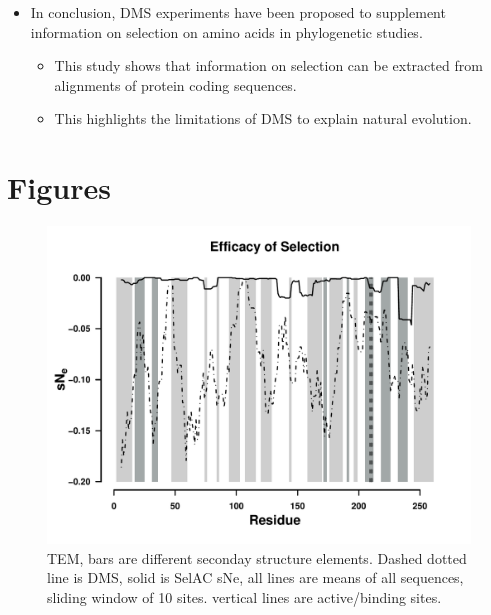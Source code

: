 \documentclass[12pt]{article}
\begin{document}
\begin{itemize}
	\item In conclusion, DMS experiments have been proposed to supplement information on selection on amino acids in phylogenetic studies.
	\begin{itemize}
		\item This study shows that information on selection can be extracted from alignments of protein coding sequences.
		\item This highlights the limitations of DMS to explain natural evolution.
	\end{itemize}
\end{itemize}

\section*{Figures}

\begin{figure}[H]
     \centering
	\includegraphics[width=\textwidth]{img/sNe_slide_TEM2016}
	\caption{TEM, bars are different seconday structure elements. Dashed dotted line is DMS, solid is SelAC sNe, all lines are means of all sequences, sliding window of 10 sites. vertical lines are active/binding sites.}
	\label{fig:tem2016_sse}
\end{figure}
\end{document}
